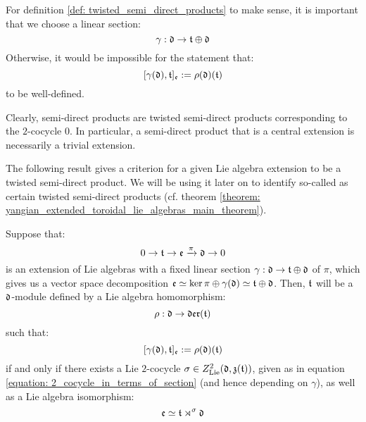         \begin{remark}
            For definition \ref{def: twisted_semi_direct_products} to make sense, it is important that we choose a linear section:
                $$\gamma: \mathfrak{d} \to \mathfrak{t} \oplus \mathfrak{d}$$
            Otherwise, it would be impossible for the statement that:
                $$[\gamma(\mathfrak{d}), \mathfrak{t}]_{\mathfrak{e}} := \rho(\mathfrak{d})(\mathfrak{t})$$
            to be well-defined.
        \end{remark}
        \begin{example}
            Clearly, semi-direct products are twisted semi-direct products corresponding to the $2$-cocycle $0$. In particular, a semi-direct product that is a central extension is necessarily a trivial extension.
        \end{example}
        The following result gives a criterion for a given Lie algebra extension to be a twisted semi-direct product. We will be using it later on to identify so-called  as certain twisted semi-direct products (cf. theorem \ref{theorem: yangian_extended_toroidal_lie_algebras_main_theorem}).
        \begin{proposition} \label{prop: twisted_semi_direct_product_criterion}
            Suppose that:
                $$0 \to \mathfrak{t} \to \mathfrak{e} \xrightarrow[]{\pi} \mathfrak{d} \to 0$$
            is an extension of Lie algebras with a fixed linear section $\gamma: \mathfrak{d} \to \mathfrak{t} \oplus \mathfrak{d}$ of $\pi$, which gives us a vector space decomposition $\mathfrak{e} \simeq \ker \pi \oplus \gamma(\mathfrak{d}) \simeq \mathfrak{t} \oplus \mathfrak{d}$. Then, $\mathfrak{t}$ will be a $\mathfrak{d}$-module defined by a Lie algebra homomorphism:
                $$\rho: \mathfrak{d} \to \mathfrak{der}(\mathfrak{t})$$
            such that:
                $$[\gamma(\mathfrak{d}), \mathfrak{t}]_{\mathfrak{e}} := \rho(\mathfrak{d})(\mathfrak{t})$$
            if and only if there exists a Lie $2$-cocycle $\sigma \in Z^2_{\mathrm{Lie}}(\mathfrak{d}, \mathfrak{z}(\mathfrak{t}))$, given as in equation \eqref{equation: 2_cocycle_in_terms_of_section} (and hence depending on $\gamma$), as well as a Lie algebra isomorphism:
                $$\mathfrak{e} \simeq \mathfrak{t} \rtimes^{\sigma} \mathfrak{d}$$
        \end{proposition}
